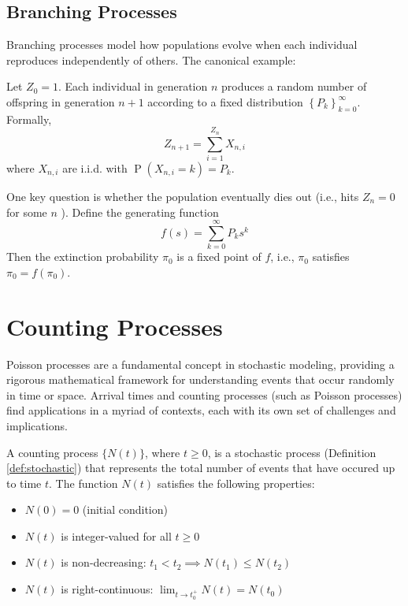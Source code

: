 \documentclass[11pt, headings=standardclasses, parskip=half, twoside]{scrartcl}
\newcommand{\Prob}{\operatorname{P}}
\begin{document}
\subsection{Branching Processes}\label{subsec:branching}
Branching processes model how populations evolve when each individual reproduces independently of others. The canonical example:
\begin{definition}\label{def:GW}
Let $Z_0=1$. Each individual in generation $n$ produces a random number of offspring in generation $n+1$ according to a fixed distribution $\left\{P_k\right\}_{k=0}^{\infty}$. Formally,
$$
Z_{n+1}=\sum_{i=1}^{Z_n} X_{n, i}
$$
where $X_{n, i}$ are i.i.d. with $\Prob(X_{n, i}=k)=P_k$.
\end{definition}
One key question is whether the population eventually dies out (i.e., hits $Z_n=0$ for some $n$ ). 
Define the generating function
$$
f(s)=\sum_{k=0}^{\infty} P_k s^k
$$
Then the extinction probability $\pi_0$ is a fixed point of $f$, i.e., $\pi_0$ satisfies $\pi_0=f(\pi_0)$.



\section{Counting Processes}\label{sec:counting}
Poisson processes are a fundamental concept in stochastic modeling, providing a rigorous mathematical framework for understanding events that occur randomly in time or space. 
Arrival times and counting processes (such as Poisson processes) find applications in a myriad of contexts, each with its own set of challenges and implications.

\begin{definition}\label{def:counting}
  A counting process \(\{N(t)\}\), where \(t \ge 0\), is a stochastic process (Definition \ref{def:stochastic}) that represents the total number of events that have occured up to time \(t\).
  The function \(N(t)\) satisfies the following properties:
  \begin{itemize}[before={\parskip = 0em}, nosep]
    \item \(N(0) = 0\) (initial condition)
    \item \(N(t)\) is integer-valued for all \(t \ge 0\)
    \item \(N(t)\) is non-decreasing: \(t_1 < t_2 \implies N(t_1) \leq N(t_2)\)
    \item \(N(t)\) is right-continuous: \(\lim_{t \to t_0^+} N(t) = N(t_0)\) \qedhere
  \end{itemize}
\end{definition}
\pagebreak[2]
\end{document}
